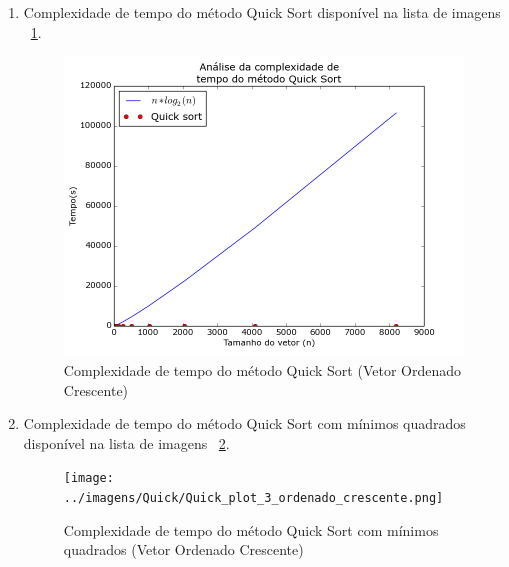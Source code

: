 \documentclass[12pt,a4paper,twoside]{report}
\begin{document}
\begin{enumerate}
\begin{enumerate}
	\end{enumerate}



			\item Complexidade de tempo do método Quick Sort disponível na lista de imagens ~\ref{fig:QuickPlot2OC}.
			\begin{figure}[!h]
				\centering
				\includegraphics[scale=0.6]{../imagens/Quick/Quick_plot_2_ordenado_crescente.png}
				\caption{Complexidade de tempo do método Quick Sort (Vetor Ordenado Crescente) \label{fig:QuickPlot2OC}}
			\end{figure}


			\item Complexidade de tempo do método Quick Sort com mínimos quadrados disponível na lista de imagens ~\ref{fig:QuickPlot3OC}.
			\begin{figure}[!h]
				\centering
				\texttt{[image: ../imagens/Quick/Quick\_plot\_3\_ordenado\_crescente.png]}
				\caption{Complexidade de tempo do método Quick Sort com mínimos quadrados (Vetor Ordenado Crescente) \label{fig:QuickPlot3OC}}
			\end{figure}

		\end{enumerate}
\end{document}
